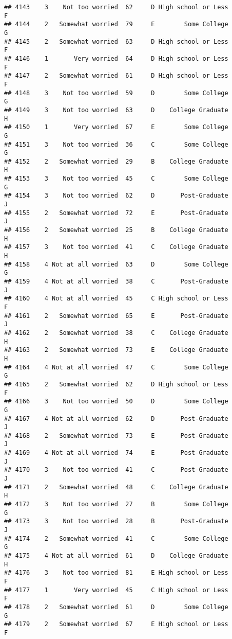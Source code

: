 \documentclass[
]{article}
\begin{document}
\begin{verbatim}
## 4143    3    Not too worried  62     D High school or Less         F
## 4144    2   Somewhat worried  79     E        Some College         G
## 4145    2   Somewhat worried  63     D High school or Less         F
## 4146    1       Very worried  64     D High school or Less         F
## 4147    2   Somewhat worried  61     D High school or Less         F
## 4148    3    Not too worried  59     D        Some College         G
## 4149    3    Not too worried  63     D    College Graduate         H
## 4150    1       Very worried  67     E        Some College         G
## 4151    3    Not too worried  36     C        Some College         G
## 4152    2   Somewhat worried  29     B    College Graduate         H
## 4153    3    Not too worried  45     C        Some College         G
## 4154    3    Not too worried  62     D       Post-Graduate         J
## 4155    2   Somewhat worried  72     E       Post-Graduate         J
## 4156    2   Somewhat worried  25     B    College Graduate         H
## 4157    3    Not too worried  41     C    College Graduate         H
## 4158    4 Not at all worried  63     D        Some College         G
## 4159    4 Not at all worried  38     C       Post-Graduate         J
## 4160    4 Not at all worried  45     C High school or Less         F
## 4161    2   Somewhat worried  65     E       Post-Graduate         J
## 4162    2   Somewhat worried  38     C    College Graduate         H
## 4163    2   Somewhat worried  73     E    College Graduate         H
## 4164    4 Not at all worried  47     C        Some College         G
## 4165    2   Somewhat worried  62     D High school or Less         F
## 4166    3    Not too worried  50     D        Some College         G
## 4167    4 Not at all worried  62     D       Post-Graduate         J
## 4168    2   Somewhat worried  73     E       Post-Graduate         J
## 4169    4 Not at all worried  74     E       Post-Graduate         J
## 4170    3    Not too worried  41     C       Post-Graduate         J
## 4171    2   Somewhat worried  48     C    College Graduate         H
## 4172    3    Not too worried  27     B        Some College         G
## 4173    3    Not too worried  28     B       Post-Graduate         J
## 4174    2   Somewhat worried  41     C        Some College         G
## 4175    4 Not at all worried  61     D    College Graduate         H
## 4176    3    Not too worried  81     E High school or Less         F
## 4177    1       Very worried  45     C High school or Less         F
## 4178    2   Somewhat worried  61     D        Some College         G
## 4179    2   Somewhat worried  67     E High school or Less         F

\end{verbatim}
\end{document}
